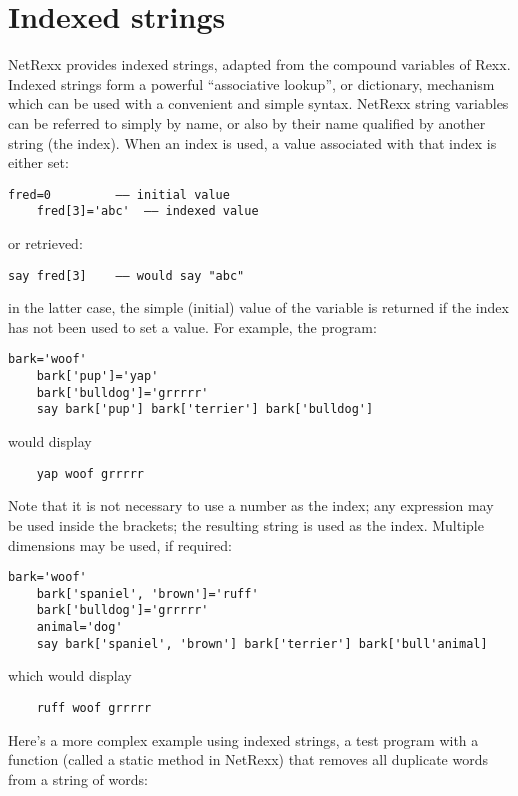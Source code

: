 \section{Indexed strings}
NetRexx provides indexed strings, adapted from the compound variables of Rexx. Indexed strings form a powerful “associative lookup”, or dictionary, mechanism which can be used with a convenient and simple syntax.
NetRexx string variables can be referred to simply by name, or also by
their name qualified by another string (the index). When an index is
used, a value associated with that index is either set:
\begin{lstlisting}[label=index,caption=Index]
    fred=0         –– initial value
    fred[3]='abc'  –– indexed value
\end{lstlisting}
or retrieved:
\begin{lstlisting}[label=retrieving,caption=Retrieving]
    say fred[3]    –– would say "abc"
\end{lstlisting}
in the latter case, the simple (initial) value of the variable is
returned if the index has not been used to set a value. For example,
the program:
\begin{lstlisting}[label=woof,caption=Woof]
    bark='woof'
    bark['pup']='yap'
    bark['bulldog']='grrrrr'
    say bark['pup'] bark['terrier'] bark['bulldog']
\end{lstlisting}
would display
\begin{verbatim}
    yap woof grrrrr
\end{verbatim}
Note that it is not necessary to use a number as the index; any
expression may be used inside the brackets; the resulting string is
used as the index. Multiple dimensions may be used, if required:
\begin{lstlisting}[label=dimensions,caption=Multiple Dimensions]
    bark='woof'
    bark['spaniel', 'brown']='ruff'
    bark['bulldog']='grrrrr'
    animal='dog'
    say bark['spaniel', 'brown'] bark['terrier'] bark['bull'animal]
\end{lstlisting}
which would display
\begin{verbatim}
    ruff woof grrrrr
\end{verbatim}
Here’s a more complex example using indexed strings, a test program
with a function (called a static method in NetRexx) that removes all
duplicate words from a string of words:
